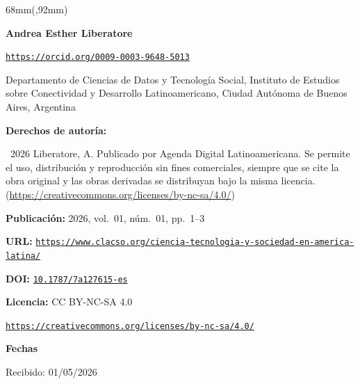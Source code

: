 \begin{textblock*}{68mm}(\gbbloquex,92mm)
{\setlength{\leftskip}{0pt}\setlength{\parindent}{0pt}%
\noindent\begin{minipage}[t]{68mm}
\sffamily\small\setlength{\parskip}{1pt}
{\bfseries\color{azulrevista}Andrea Esther Liberatore}\par
{\scriptsize\texttt{\href{https://orcid.org/0009-0003-9648-5013}{https://orcid.org/0009-0003-9648-5013}}}\par
Departamento de Ciencias de Datos y Tecnología Social, Instituto de Estudios sobre Conectividad y Desarrollo Latinoamericano, Ciudad Autónoma de Buenos Aires, Argentina\par
\vspace{6pt}
{\bfseries\color{azulrevista!70}Derechos de autor\'ia:}\par
\textcopyright\ 2026 Liberatore, A. Publicado por Agenda Digital Latinoamericana. Se permite el uso, distribución y reproducción sin fines comerciales, siempre que se cite la obra original y las obras derivadas se distribuyan bajo la misma licencia. (\href{https://creativecommons.org/licenses/by-nc-sa/4.0/}{https://creativecommons.org/licenses/by-nc-sa/4.0/})\par\vspace{6pt}
{\bfseries\color{azulrevista!70}Publicación:} 2026, vol.~01, n\'um.~01, pp.~1--3\par\vspace{6pt}
{\bfseries\color{azulrevista!70}URL:} {\scriptsize\texttt{\href{https://www.clacso.org/ciencia-tecnologia-y-sociedad-en-america-latina/}{https://www.clacso.org/ciencia-tecnologia-y-sociedad-en-america-latina/}}}\par\vspace{6pt}
{\bfseries\color{azulrevista!70}DOI:} {\scriptsize\texttt{\href{https://doi.org/10.1787/7a127615-es}{10.1787/7a127615-es}}}\par\vspace{6pt}
{\bfseries\color{azulrevista!70}Licencia:} CC BY-NC-SA 4.0\par
{\scriptsize\texttt{\href{https://creativecommons.org/licenses/by-nc-sa/4.0/}{https://creativecommons.org/licenses/by-nc-sa/4.0/}}}\par
\vspace{6pt}
{\bfseries\color{azulrevista!70}Fechas}\par\vspace{2pt}
Recibido: 01/05/2026\par

\end{minipage}}
\end{textblock*}
